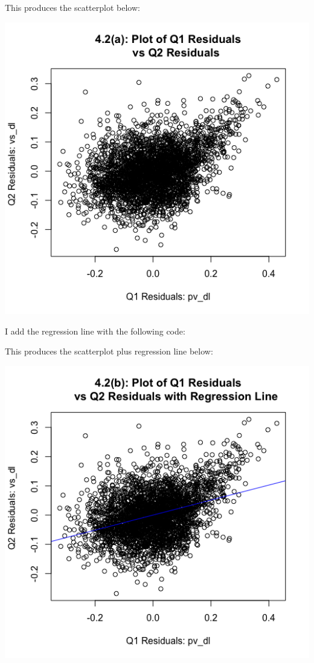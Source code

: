 \documentclass[12pt,letterpaper]{article}
\begin{document}
\begin{enumerate}
This produces the scatterplot below:
\begin{center}	
	\includegraphics[scale=.80]{Plot4.2(a).png}		\end{center}


I add the regression line with the following code:


This produces the scatterplot plus regression line below:		
\begin{center}	
	\includegraphics[scale=.80]{Plot4.2(b).png}		\end{center}
		

\end{enumerate}
\end{document}
